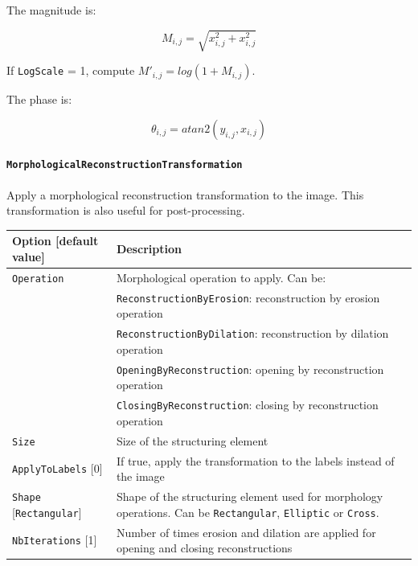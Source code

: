\documentclass[a4paper,11pt,oneside]{article}
\newcommand{\iponly}{\reversemarginpar
    \marginnote{\color{listletiblue}\normalfont\scriptsize
    {\ttfamily{}\hyperref[sec:N2D2-IP]{\color{listletiblue}N2D2 IP}} \emph{only}}}
\begin{document}
The magnitude is:

\[ M_{i,j} = \sqrt{x_{i,j}^2 + x_{i,j}^2} \]

If \lstinline!LogScale! = 1, compute $M'_{i,j} = log(1 + M_{i,j})$.

The phase is:

\[ \theta_{i,j} = atan2(y_{i,j}, x_{i,j}) \]



\paragraph{\texorpdfstring{%
\lstinline[basicstyle=\ttfamily\bfseries]
!MorphologicalReconstructionTransformation!\protect\iponly}
{MorphologicalReconstructionTransformation}}
Apply a morphological reconstruction transformation to the image.
This transformation is also useful for post-processing.

\begin{center}
 \begin{tabular}{| p{5cm} | p{10cm} | }
 \hline
 Option [default value] & Description\\
 \hline\hline
  \cellcolor{requiredcolor}\lstinline!Operation! & Morphological operation to
  apply. Can be:\\
   & \lstinline!ReconstructionByErosion!: reconstruction by erosion operation \\
   & \lstinline!ReconstructionByDilation!: reconstruction by dilation
   operation \\
   & \lstinline!OpeningByReconstruction!: opening by reconstruction operation \\
   & \lstinline!ClosingByReconstruction!: closing by reconstruction operation \\
  \cellcolor{requiredcolor}\lstinline!Size! & Size of the structuring element \\
  \lstinline!ApplyToLabels! [0] & If true, apply the transformation to the
  labels instead of the image \\
  \lstinline!Shape! [\lstinline!Rectangular!] & Shape of the structuring element
   used for morphology operations. Can be \lstinline!Rectangular!,
   \lstinline!Elliptic! or \lstinline!Cross!. \\
  \lstinline!NbIterations! [1] & Number of times erosion and dilation are
  applied for opening and closing reconstructions \\
 \hline
\end{tabular}
\end{center}
\end{document}
